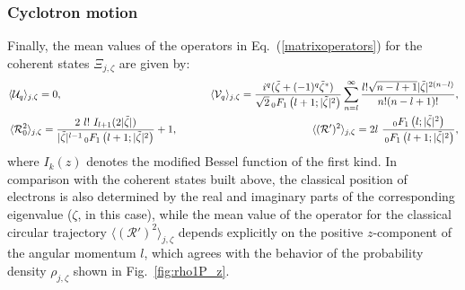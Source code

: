 \documentclass[aps,showpacs,showkeys]{revtex4}
\begin{document}
\subsubsection{Cyclotron motion}


	Finally, the mean values of the operators in Eq.~(\ref{matrixoperators}) for the coherent states $\Xi_{j,\zeta}$ are given by:
	\begin{eqnarray}
		 \langle\mathcal{U}_{q}\rangle_{j,\zeta}=0,\hskip3.87cm & &\qquad\; \langle\mathcal{V}_{q}\rangle_{j,\zeta}=\frac{i^{q}(\tilde{\zeta}+(-1)^{q}\tilde{\zeta}^{\ast})}{\sqrt{2}\,_0F_1\left(l+1;\vert\tilde{\zeta}\vert^2\right)}\sum_{n=l}^{\infty}\frac{l!\sqrt{n-l+1}\vert\tilde{\zeta}\vert^{2(n-l)}}{n!(n-l+1)!}, \\
		\langle\mathcal{R}_{0}^{2}\rangle_{j,\zeta}=\frac{2\ l!\ I_{l+1}(2\vert\tilde{\zeta}\vert)}{\vert\tilde{\zeta}\vert^{l-1}\,_0F_1\left(l+1;\vert\tilde{\zeta}\vert^2\right)}+1, &&\quad 
		\langle(\mathcal{R}')^{2} \rangle_{j,\zeta}=2l\ \frac{_0F_1\left(l;\vert\tilde{\zeta}\vert^2\right)}{\,_0F_1\left(l+1;\vert\tilde{\zeta}\vert^2\right)},
	\end{eqnarray}
where $I_{k}(z)$ denotes the modified Bessel function of the first kind. In comparison with the coherent states built above, the classical position of electrons is also determined by the real and imaginary parts of the corresponding eigenvalue ($\zeta$, in this case), while the mean value of the operator for the classical circular trajectory $\langle(\mathcal{R}')^{2} \rangle_{j,\zeta}$ depends explicitly on the positive $z$-component of the angular momentum $l$, which agrees with the behavior of the probability density $\rho_{j,\zeta}$ shown in Fig.~\ref{fig:rho1P_z}.
\end{document}
